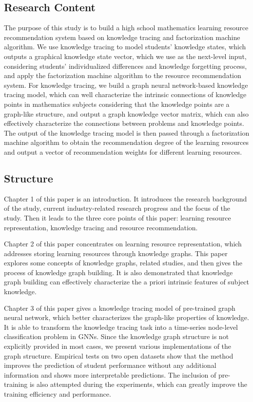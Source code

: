 \documentclass[11pt,en]{elegantpaper}
\begin{document}
\subsection{Research Content}
The purpose of this study is to build a high school mathematics learning resource recommendation system based on knowledge tracing and factorization machine algorithm. We use knowledge tracing to model students' knowledge states, which outputs a graphical knowledge state vector, which we use as the next-level input, considering students' individualized differences and knowledge forgetting process, and apply the factorization machine algorithm to the resource recommendation system. For knowledge tracing, we build a graph neural network-based knowledge tracing model, which can well characterize the intrinsic connections of knowledge points in mathematics subjects considering that the knowledge points are a graph-like structure, and output a graph knowledge vector matrix, which can also effectively characterize the connections between problems and knowledge points. The output of the knowledge tracing model is then passed through a factorization machine algorithm to obtain the recommendation degree of the learning resources and output a vector of recommendation weights for different learning resources.

\subsection{Structure}
Chapter 1 of this paper is an introduction. It introduces the research background of the study, current industry-related research progress and the focus of the study. Then it leads to the three core points of this paper: learning resource representation, knowledge tracing and resource recommendation.

Chapter 2 of this paper concentrates on learning resource representation, which addresses storing learning resources through knowledge graphs. This paper explores some concepts of knowledge graphs, related studies, and then gives the process of knowledge graph building. It is also demonstrated that knowledge graph building can effectively characterize the a priori intrinsic features of subject knowledge.

Chapter 3 of this paper gives a knowledge tracing model of pre-trained graph neural network, which better characterizes the graph-like properties of knowledge. It is able to transform the knowledge tracing task into a time-series node-level classification problem in GNNs. Since the knowledge graph structure is not explicitly provided in most cases, we present various implementations of the graph structure. Empirical tests on two open datasets show that the method improves the prediction of student performance without any additional information and shows more interpretable predictions. The inclusion of pre-training is also attempted during the experiments, which can greatly improve the training efficiency and performance.
\end{document}
